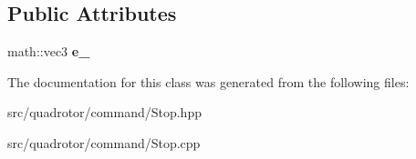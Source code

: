 \subsection*{\-Public \-Attributes}
\begin{DoxyCompactItemize}
\item 
\hypertarget{classCommand_1_1Stop_1_1VSettle_a34a092cedcae2ea8bda7ccc75028345a}{math\-::vec3 {\bfseries e\-\_\-}}\label{classCommand_1_1Stop_1_1VSettle_a34a092cedcae2ea8bda7ccc75028345a}

\end{DoxyCompactItemize}


\-The documentation for this class was generated from the following files\-:\begin{DoxyCompactItemize}
\item 
src/quadrotor/command/\-Stop.\-hpp\item 
src/quadrotor/command/\-Stop.\-cpp\end{DoxyCompactItemize}
